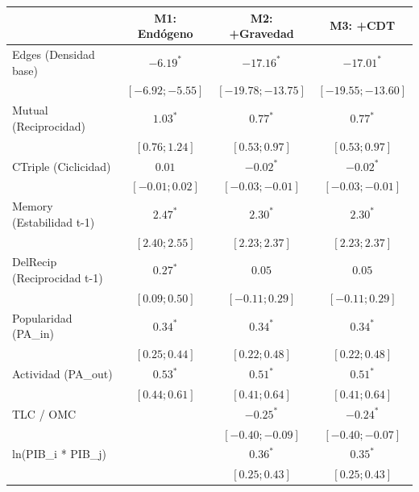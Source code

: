 
\begin{table}
\begin{center}
\begin{tabular}{l c c c}
\hline
 & M1: Endógeno & M2: +Gravedad & M3: +CDT \\
\hline
Edges (Densidad base)       & $-6.19^{*}$       & $-17.16^{*}$        & $-17.01^{*}$        \\
                            & $ [-6.92; -5.55]$ & $ [-19.78; -13.75]$ & $ [-19.55; -13.60]$ \\
Mutual (Reciprocidad)       & $1.03^{*}$        & $0.77^{*}$          & $0.77^{*}$          \\
                            & $ [ 0.76;  1.24]$ & $ [  0.53;   0.97]$ & $ [  0.53;   0.97]$ \\
CTriple (Ciclicidad)        & $0.01$            & $-0.02^{*}$         & $-0.02^{*}$         \\
                            & $ [-0.01;  0.02]$ & $ [ -0.03;  -0.01]$ & $ [ -0.03;  -0.01]$ \\
Memory (Estabilidad t-1)    & $2.47^{*}$        & $2.30^{*}$          & $2.30^{*}$          \\
                            & $ [ 2.40;  2.55]$ & $ [  2.23;   2.37]$ & $ [  2.23;   2.37]$ \\
DelRecip (Reciprocidad t-1) & $0.27^{*}$        & $0.05$              & $0.05$              \\
                            & $ [ 0.09;  0.50]$ & $ [ -0.11;   0.29]$ & $ [ -0.11;   0.29]$ \\
Popularidad (PA\_in)        & $0.34^{*}$        & $0.34^{*}$          & $0.34^{*}$          \\
                            & $ [ 0.25;  0.44]$ & $ [  0.22;   0.48]$ & $ [  0.22;   0.48]$ \\
Actividad (PA\_out)         & $0.53^{*}$        & $0.51^{*}$          & $0.51^{*}$          \\
                            & $ [ 0.44;  0.61]$ & $ [  0.41;   0.64]$ & $ [  0.41;   0.64]$ \\
TLC / OMC                   &                   & $-0.25^{*}$         & $-0.24^{*}$         \\
                            &                   & $ [ -0.40;  -0.09]$ & $ [ -0.40;  -0.07]$ \\
ln(PIB\_i * PIB\_j)         &                   & $0.36^{*}$          & $0.35^{*}$          \\
                            &                   & $ [  0.25;   0.43]$ & $ [  0.25;   0.43]$ \\

\end{tabular}
\end{center}
\end{table}
